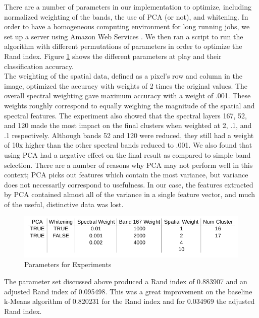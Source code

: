 \documentclass[journal]{IEEEtran}
\begin{document}
  There are a number of parameters in our implementation to optimize, including normalized weighting of the bands, the use of PCA (or not), and whitening.  In order to have a homogeneous computing environment for long running jobs, we set up a server using Amazon Web Services \cite{AWS}. We then ran a script to run the algorithm with different permutations of parameters in order to optimize the Rand index. Figure \ref{fig:Parameters} shows the different parameters at play and their classification accuracy.\\

  The weighting of the spatial data, defined as a pixel’s row and column in the image, optimized the accuracy with weights of 2 times the original values. The overall spectral weighting gave maximum accuracy with a weight of .001. These weights roughly correspond to equally weighing the magnitude of the spatial and spectral features. The experiment also showed that the spectral layers 167, 52, and 120 made the most impact on the final clusters when weighted at 2, .1, and .1 respectively. Although bands 52 and 120 were reduced, they still had a weight of 10x higher than the other spectral bands reduced to .001. We also found that using PCA had a negative effect on the final result as compared to simple band selection. There are a number of reasons why PCA may not perform well in this context; PCA picks out features which contain the most variance, but variance does not necessarily correspond to usefulness. In our case, the features extracted by PCA contained almost all of the variance in a single feature vector, and much of the useful, distinctive data was lost.\\

  \begin{figure}[h!]
    \centering\includegraphics[width=\columnwidth]{images/parameters.png}
    \caption{Parameters for Experiments}
    \label{fig:Parameters}
  \end{figure}

  The parameter set discussed above produced a Rand index of 0.883907 and an adjusted Rand index of 0.095498. This was a great improvement on the baseline k-Means algorithm of 0.820231 for the Rand index and for 0.034969 the adjusted Rand index.\\
\end{document}
